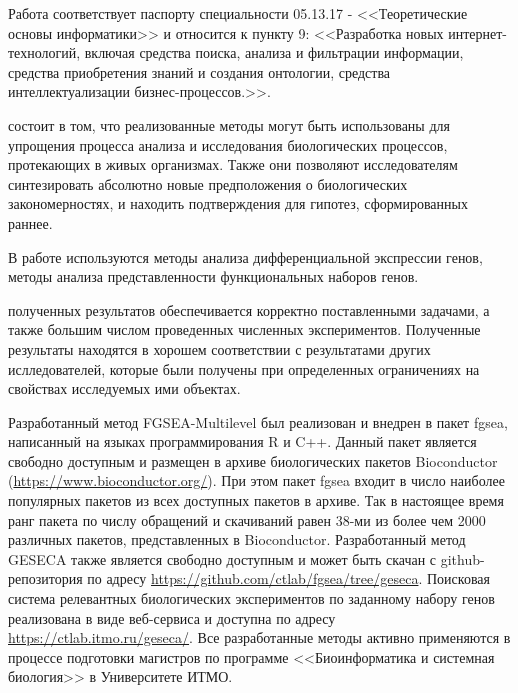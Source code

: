 {\passport} Работа соответствует паспорту специальности 05.13.17 - <<Теоретические основы информатики>> и относится к пункту 9: <<Разработка новых интернет-технологий, включая средства поиска, анализа и фильтрации информации, средства приобретения знаний и создания онтологии, средства интеллектуализации бизнес-процессов.>>.


{\influence} состоит в том, что реализованные методы могут быть использованы для упрощения процесса анализа и исследования биологических процессов, протекающих в живых организмах. 
Также они позволяют исследователям синтезировать абсолютно новые предположения о биологических закономерностях, и находить подтверждения для гипотез, сформированных раннее. 

{\methods} В работе используются методы анализа дифференциальной экспрессии генов, методы анализа представленности функциональных наборов генов.



{\reliability} полученных результатов обеспечивается корректно поставленными задачами, а также большим числом проведенных численных экспериментов.
Полученные результаты находятся в хорошем соответствии с результатами других ислледователей, которые были получены при определенных ограничениях на свойствах исследуемых ими объектах.

{\integration} Разработанный метод FGSEA-Multilevel был реализован и внедрен в пакет fgsea, написанный на языках программирования R и C++. 
Данный пакет является свободно доступным и размещен в архиве биологических пакетов Bioconductor (\url{https://www.bioconductor.org/}).
При этом пакет fgsea входит в число наиболее популярных пакетов из всех доступных пакетов в архиве.
Так в настоящее время ранг пакета по числу обращений и скачиваний равен 38-ми из более чем 2000 различных пакетов, представленных в Bioconductor.
Разработанный метод GESECA также является свободно доступным и может быть скачан с github-репозитория по адресу \url{https://github.com/ctlab/fgsea/tree/geseca}. Поисковая система релевантных биологических экспериментов по заданному набору генов реализована в виде веб-сервиса и доступна по адресу \url{https://ctlab.itmo.ru/geseca/}. Все разработанные методы активно применяются в процессе подготовки магистров по программе <<Биоинформатика и системная биология>> в Университете ИТМО.


